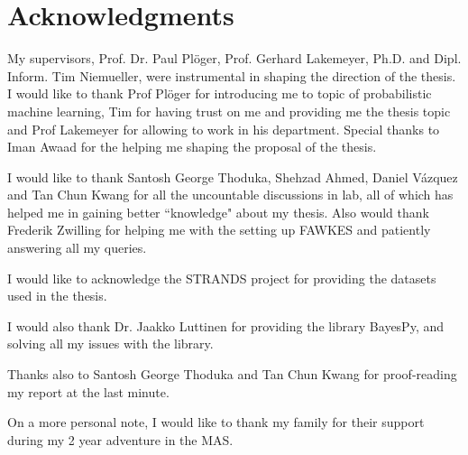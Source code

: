  
\chapter*{Acknowledgments}

My supervisors, Prof. Dr. Paul Pl\"{o}ger, Prof. Gerhard Lakemeyer, Ph.D. and Dipl. Inform. Tim Niemueller, were instrumental in shaping the direction of the thesis. I would like to thank Prof Pl\"{o}ger for introducing me to topic of probabilistic machine learning, Tim for having trust on me and providing me the thesis topic and Prof Lakemeyer for allowing to work in his department. Special thanks to Iman Awaad for the helping me shaping the proposal of the thesis.

I would like to thank Santosh George Thoduka, Shehzad Ahmed, Daniel Vázquez and Tan Chun Kwang for all the uncountable discussions in lab,
 all of which has helped me in gaining better ``knowledge" about my thesis. 
Also would thank Frederik Zwilling for helping me with the setting up FAWKES and patiently answering all my queries. 

I would like to acknowledge the STRANDS project for providing the datasets used in the thesis. 
 
I would also thank Dr. Jaakko Luttinen for providing the library BayesPy, and solving all my issues with the library. 

Thanks also to Santosh George Thoduka and Tan Chun Kwang for proof-reading my report at the last minute.

On a more personal note, I would like to thank my family for their support during my 2 year adventure in the MAS.